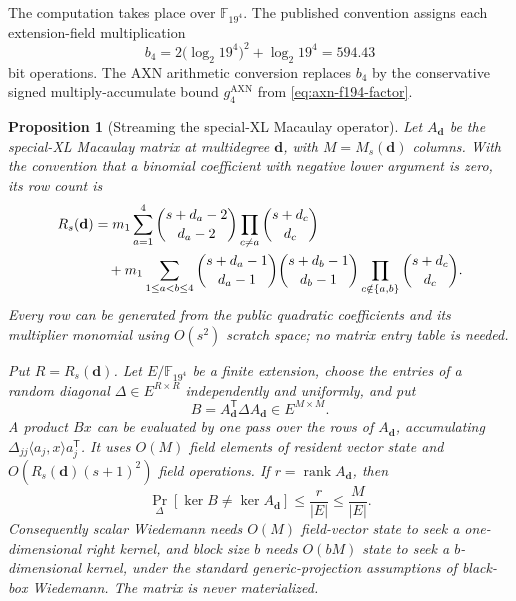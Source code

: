 \documentclass[11pt]{article}
\newtheorem{proposition}[proposition]{Proposition}
\newcommand{\F}{\mathbb F}
\newcommand{\rank}{\operatorname{rank}}
\newcommand{\transpose}{\mathsf T}
\begin{document}
The computation takes place over $\F_{19^4}$.  The published convention assigns
each extension-field multiplication
\begin{equation}\label{eq:bitop-conversion}
 b_4=2\bigl(\log_2 19^4\bigr)^2+\log_2 19^4=594.43
\end{equation}
bit operations.  The AXN arithmetic conversion replaces $b_4$ by the conservative
signed multiply-accumulate bound $g_4^{\mathrm{AXN}}$ from
\eqref{eq:axn-f194-factor}.

\begin{proposition}[Streaming the special-XL Macaulay operator]
\label{prop:streaming-macaulay}
Let $A_{\mathbf d}$ be the special-XL Macaulay matrix at multidegree
$\mathbf d$, with $M=M_s(\mathbf d)$ columns.  With the convention that a
binomial coefficient with negative lower argument is zero, its row count is
\begin{align}
 R_s(\mathbf d)
 &=m_1\sum_{a=1}^{4}
   \binom{s+d_a-2}{d_a-2}\prod_{c\ne a}\binom{s+d_c}{d_c}
 \notag\\
 &\quad{}+m_1\sum_{1\le a<b\le4}
   \binom{s+d_a-1}{d_a-1}\binom{s+d_b-1}{d_b-1}
   \prod_{c\notin\{a,b\}}\binom{s+d_c}{d_c}.
 \label{eq:macaulay-row-count}
\end{align}
Every row can be generated from the public quadratic coefficients and its
multiplier monomial using $O(s^2)$ scratch space; no matrix entry table is
needed.

Put $R=R_s(\mathbf d)$.  Let $E/\F_{19^4}$ be a finite extension, choose
the entries of a random diagonal $\Delta\in E^{R\times R}$ independently and
uniformly, and put
\begin{equation}\label{eq:streamed-normal-operator}
 B=A_{\mathbf d}^{\transpose}\Delta A_{\mathbf d}\in E^{M\times M}.
\end{equation}
A product $Bx$ can be evaluated by one pass over the rows of
$A_{\mathbf d}$, accumulating
$\Delta_{jj}\langle a_j,x\rangle a_j^{\transpose}$.  It uses $O(M)$ field
elements of resident vector state and
$O(R_s(\mathbf d)(s+1)^2)$ field operations.  If
$r=\rank A_{\mathbf d}$, then
\begin{equation}\label{eq:preconditioner-success}
 \Pr_{\Delta}[\ker B\ne\ker A_{\mathbf d}]
 \le \frac{r}{|E|}\le\frac{M}{|E|}.
\end{equation}
Consequently scalar Wiedemann needs $O(M)$ field-vector state to seek a
one-dimensional right kernel, and block size $b$ needs $O(bM)$ state to seek a
$b$-dimensional kernel, under the standard generic-projection assumptions of
black-box Wiedemann.  The matrix is never materialized.


\end{proposition}
\end{document}
